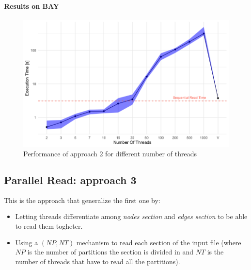 \documentclass[twocolumn, switch]{article} %
\begin{document}
\paragraph{Results on BAY}
\begin{figure}[ht!]
  \centering
  \includegraphics[width=1\linewidth]{par_read_2_time.png}
  \caption{Performance of approach 2 for different number of threads}
  \label{parread2time}
\end{figure}
\subsection{Parallel Read: approach 3}
This is the approach that generalize the first one by:
\begin{itemize}
  \item Letting threads differentiate among \textit{nodes section} and 
        \textit{edges section} to be able to read them togheter.
  \item Using a $(NP, NT)$ mechanism to read each section of the input file (where
        $NP$ is the number of partitions the section is divided in and $NT$ is the number
        of threads that have to read all the partitions).
\end{itemize}
\end{document}
